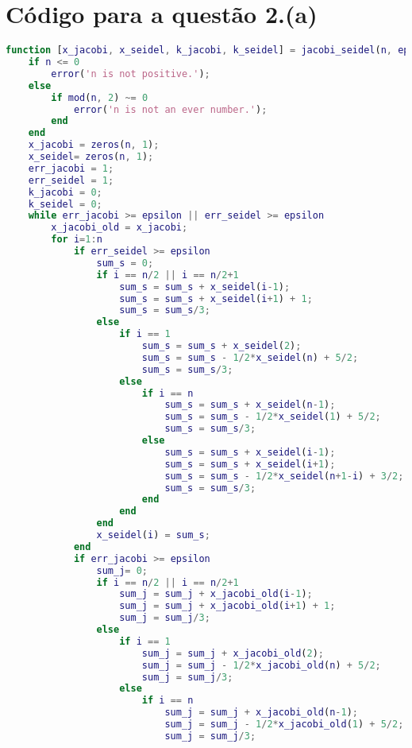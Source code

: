 \documentclass{article}
\begin{document}
    \section{Código para a questão 2.(a)}
        \label{appendix:b}

        \begin{lstlisting}[language=Matlab]
function [x_jacobi, x_seidel, k_jacobi, k_seidel] = jacobi_seidel(n, epsilon)
    if n <= 0
        error('n is not positive.');
    else
        if mod(n, 2) ~= 0
            error('n is not an ever number.');
        end
    end
    x_jacobi = zeros(n, 1);
    x_seidel= zeros(n, 1);    
    err_jacobi = 1;
    err_seidel = 1;
    k_jacobi = 0;
    k_seidel = 0;
    while err_jacobi >= epsilon || err_seidel >= epsilon
        x_jacobi_old = x_jacobi;
        for i=1:n
            if err_seidel >= epsilon
                sum_s = 0;
                if i == n/2 || i == n/2+1
                    sum_s = sum_s + x_seidel(i-1);
                    sum_s = sum_s + x_seidel(i+1) + 1;
                    sum_s = sum_s/3;
                else
                    if i == 1
                        sum_s = sum_s + x_seidel(2);
                        sum_s = sum_s - 1/2*x_seidel(n) + 5/2;
                        sum_s = sum_s/3;
                    else
                        if i == n
                            sum_s = sum_s + x_seidel(n-1);
                            sum_s = sum_s - 1/2*x_seidel(1) + 5/2;
                            sum_s = sum_s/3;
                        else
                            sum_s = sum_s + x_seidel(i-1);
                            sum_s = sum_s + x_seidel(i+1);
                            sum_s = sum_s - 1/2*x_seidel(n+1-i) + 3/2;
                            sum_s = sum_s/3;
                        end
                    end
                end
                x_seidel(i) = sum_s;
            end
            if err_jacobi >= epsilon
                sum_j= 0;
                if i == n/2 || i == n/2+1
                    sum_j = sum_j + x_jacobi_old(i-1);
                    sum_j = sum_j + x_jacobi_old(i+1) + 1;
                    sum_j = sum_j/3;
                else
                    if i == 1
                        sum_j = sum_j + x_jacobi_old(2);
                        sum_j = sum_j - 1/2*x_jacobi_old(n) + 5/2;
                        sum_j = sum_j/3;
                    else
                        if i == n
                            sum_j = sum_j + x_jacobi_old(n-1);
                            sum_j = sum_j - 1/2*x_jacobi_old(1) + 5/2;
                            sum_j = sum_j/3;

\end{lstlisting}
\end{document}

